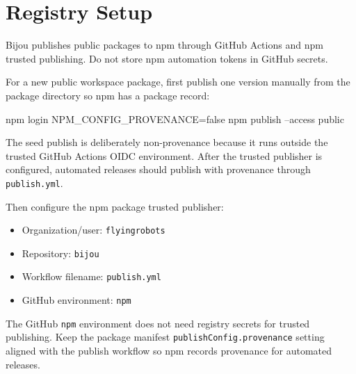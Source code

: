 \section{Registry Setup}\label{record-274-registry-setup}

Bijou publishes public packages to npm through GitHub Actions and npm trusted publishing. Do not store npm automation tokens in GitHub secrets.

For a new public workspace package, first publish one version manually from the package directory so npm has a package record:

\begin{CodeBlock}
npm login
NPM_CONFIG_PROVENANCE=false npm publish --access public
\end{CodeBlock}

The seed publish is deliberately non-provenance because it runs outside the trusted GitHub Actions OIDC environment. After the trusted publisher is configured, automated releases should publish with provenance through \texttt{p\allowbreak{}u\allowbreak{}b\allowbreak{}l\allowbreak{}i\allowbreak{}s\allowbreak{}h\allowbreak{}.\allowbreak{}y\allowbreak{}m\allowbreak{}l}.

Then configure the npm package trusted publisher:

\begin{itemize}
\tightlist
\item
  Organization/user: \texttt{f\allowbreak{}l\allowbreak{}y\allowbreak{}i\allowbreak{}n\allowbreak{}g\allowbreak{}r\allowbreak{}o\allowbreak{}b\allowbreak{}o\allowbreak{}t\allowbreak{}s}
\item
  Repository: \texttt{b\allowbreak{}i\allowbreak{}j\allowbreak{}o\allowbreak{}u}
\item
  Workflow filename: \texttt{p\allowbreak{}u\allowbreak{}b\allowbreak{}l\allowbreak{}i\allowbreak{}s\allowbreak{}h\allowbreak{}.\allowbreak{}y\allowbreak{}m\allowbreak{}l}
\item
  GitHub environment: \texttt{n\allowbreak{}p\allowbreak{}m}
\end{itemize}

The GitHub \texttt{n\allowbreak{}p\allowbreak{}m} environment does not need registry secrets for trusted publishing. Keep the package manifest \texttt{p\allowbreak{}u\allowbreak{}b\allowbreak{}l\allowbreak{}i\allowbreak{}s\allowbreak{}h\allowbreak{}C\allowbreak{}o\allowbreak{}n\allowbreak{}f\allowbreak{}i\allowbreak{}g\allowbreak{}.\allowbreak{}p\allowbreak{}r\allowbreak{}o\allowbreak{}v\allowbreak{}e\allowbreak{}n\allowbreak{}a\allowbreak{}n\allowbreak{}c\allowbreak{}e} setting aligned with the publish workflow so npm records provenance for automated releases.

